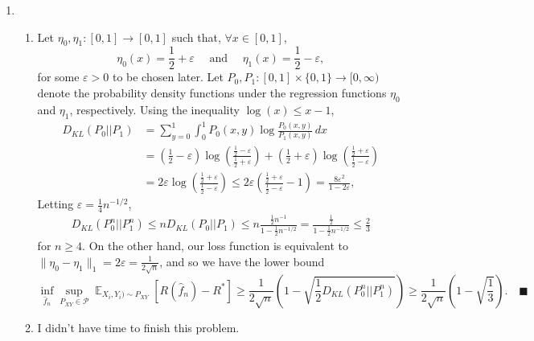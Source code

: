 \documentclass[11pt]{article}
\renewcommand{\qed}{\quad \ensuremath{\blacksquare}}
\newcommand{\E}{\mathop{\mathbb{E}}} %
\newcommand{\Pds}{\mathcal{P}}
\newcommand{\e}{\varepsilon} %
\renewcommand{\hat}{\widehat}
\begin{document}
\begin{enumerate}
\begin{enumerate}
\end{enumerate}

\newpage
\item
\begin{enumerate}
\item Let $\eta_0, \eta_1 : [0,1] \to [0,1]$ such that, $\forall x \in [0,1]$,
\[\eta_0(x) = \frac{1}{2} + \e
    \quad \mbox{ and } \quad
    \eta_1(x) = \frac{1}{2} - \e,\]
for some $\e > 0$ to be chosen later. Let
$P_0,P_1 : [0,1] \times\{0,1\} \to [0,\infty)$ denote the probability density
functions under the regression functions $\eta_0$ and $\eta_1$, respectively.
Using the inequality $\log(x) \leq x - 1$,
\begin{align*}
D_{KL}(P_0||P_1)
 &  = \sum_{y = 0}^1 \int_0^1 P_0(x,y) \log \frac{P_0(x,y)}{P_1(x,y)} \, dx \\
 &  = \left( \frac12 - \e \right)
                        \log \left( \frac{\frac12 - \e}{\frac12 + \e} \right)
    + \left( \frac12 + \e \right)
                    \log \left( \frac{\frac12 + \e}{\frac12 - \e} \right)   \\
 &  = 2\e \log \left( \frac{\frac12 + \e}{\frac12 - \e} \right)
    \leq 2\e \left( \frac{\frac12 + \e}{\frac12 - \e} - 1 \right)
    = \frac{8\e^2}{1 - 2\e},
\end{align*}
Letting $\e = \frac{1}{4}n^{-1/2}$,
\begin{align*}
D_{KL}(P_0^n||P_1^n)
    \leq nD_{KL}(P_0||P_1)
    \leq n\frac{\frac12n^{-1}}{1 - \frac12n^{-1/2}}
    = \frac{\frac12}{1 - \frac12n^{-1/2}}
    \leq \frac23
\end{align*}
for $n \geq 4$. On the other hand, our loss function is equivalent to
$\|\eta_0 - \eta_1\|_1 = 2\e = \frac{1}{2\sqrt n}$, and so we have the lower
bound
\[\inf_{\hat f_n} \sup_{P_{XY} \in \Pds}
    \E_{X_i,Y_i) \sim P_{XY}}\left[ R(\hat f_n) - R^* \right]
    \geq \frac{1}{2\sqrt n} \left( 1 - \sqrt{\frac{1}{2}D_{KL}(P_0^n||P_1^n)} \right)
    \geq \frac{1}{2\sqrt n} \left( 1 - \sqrt{\frac13} \right). \qed
\]

\item I didn't have time to finish this problem.

\end{enumerate}
\end{enumerate}
\end{document}

